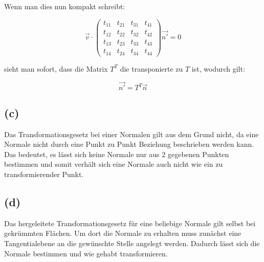 \documentclass[12pt]{scrreprt}
\begin{document}
Wenn man dies nun kompakt schreibt:

\[
	\vec{v} \cdot
	\begin{pmatrix}
		t_{11} & t_{21} & t_{31} & t_{41}\\
		t_{12} & t_{22} & t_{32} & t_{42}\\
		t_{13} & t_{23} & t_{33} & t_{43}\\
		t_{14} & t_{24} & t_{34} & t_{44}
	\end{pmatrix}
	\vec{n'} = 0
\]

sieht man sofort, dass die Matrix $T^T$ die transponierte zu $T$ ist, wodurch gilt:

\[
	\vec{n'} = T^T \vec{n}
\]

\subsection*{(c)}
Das Transformationsgesetz bei einer Normalen gilt aus dem Grund nicht, da eine Normale nicht durch eine Punkt zu Punkt Beziehung beschrieben werden kann. Das bedeutet, es lässt sich keine Normale nur aus 2 gegebenen Punkten bestimmen und somit verhält sich eine Normale auch nicht wie ein zu transformierender Punkt.
\subsection*{(d)}
Das hergeleitete Transformationsgesetz für eine beliebige Normale gilt selbst bei gekrümmten Flächen. Um dort die Normale zu erhalten muss zunächst eine Tangentialebene an die gewünschte Stelle angelegt werden. Dadurch lässt sich die Normale bestimmen und wie gehabt transformieren.
\end{document}
